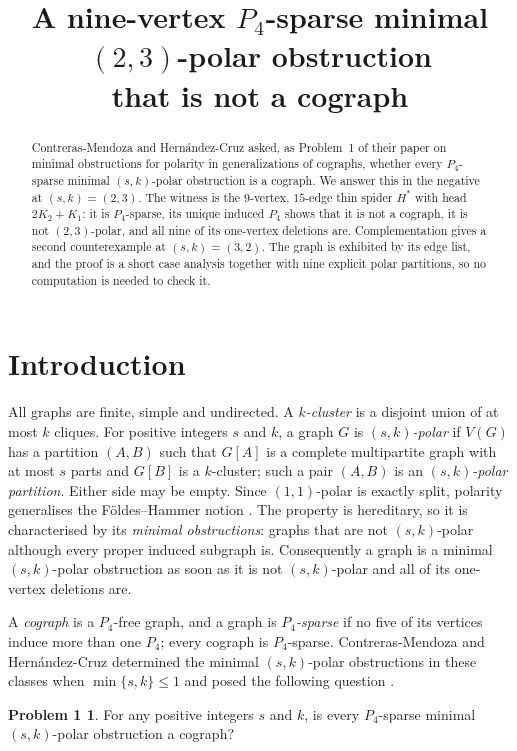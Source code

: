 \documentclass[11pt]{amsart}
\title[A $P_4$-sparse minimal $(2,3)$-polar obstruction that is not a cograph]
{A nine-vertex $P_4$-sparse minimal $(2,3)$-polar obstruction\\ that is not a cograph}
\date{}
\theoremstyle{definition}
\newtheorem*{problem}{Problem 1}
\theoremstyle{remark}
\newcommand{\Hstar}{H^{*}}
\begin{document}
\begin{abstract}
Contreras-Mendoza and Hern\'andez-Cruz asked, as Problem~1 of their paper on minimal
obstructions for polarity in generalizations of cographs, whether every $P_4$-sparse minimal
$(s,k)$-polar obstruction is a cograph. We answer this in the negative at $(s,k)=(2,3)$. The
witness is the $9$-vertex, $15$-edge thin spider $\Hstar$ with head $2K_2+K_1$: it is
$P_4$-sparse, its unique induced $P_4$ shows that it is not a cograph, it is not
$(2,3)$-polar, and all nine of its one-vertex deletions are. Complementation gives a second
counterexample at $(s,k)=(3,2)$. The graph is exhibited by its edge list, and the proof is a
short case analysis together with nine explicit polar partitions, so no computation is needed
to check it.
\end{abstract}

\maketitle

\section{Introduction}

All graphs are finite, simple and undirected. A \emph{$k$-cluster} is a disjoint union of at
most $k$ cliques. For positive integers $s$ and $k$, a graph $G$ is \emph{$(s,k)$-polar} if
$V(G)$ has a partition $(A,B)$ such that $G[A]$ is a complete multipartite graph with at most
$s$ parts and $G[B]$ is a $k$-cluster; such a pair $(A,B)$ is an \emph{$(s,k)$-polar
partition}. Either side may be empty. Since $(1,1)$-polar is exactly split, polarity
generalises the F\"oldes--Hammer notion \cite{FoldesHammer}. The property is hereditary, so it
is characterised by its \emph{minimal obstructions}: graphs that are not $(s,k)$-polar although
every proper induced subgraph is. Consequently a graph is a minimal $(s,k)$-polar obstruction
as soon as it is not $(s,k)$-polar and all of its one-vertex deletions are.

A \emph{cograph} is a $P_4$-free graph, and a graph is \emph{$P_4$-sparse} if no five of its
vertices induce more than one $P_4$; every cograph is $P_4$-sparse. Contreras-Mendoza and
Hern\'andez-Cruz determined the minimal $(s,k)$-polar obstructions in these classes when
$\min\{s,k\}\le 1$ and posed the following question \cite[Problem~1]{CMHC24}.

\begin{problem}
For any positive integers $s$ and $k$, is every $P_4$-sparse minimal $(s,k)$-polar obstruction
a cograph?
\end{problem}
\end{document}
